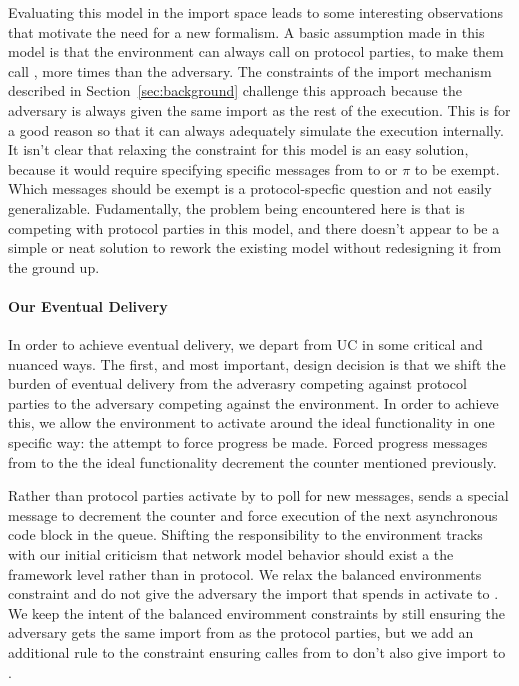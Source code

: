 Evaluating this model in the import space leads to some interesting observations that motivate the need for a new formalism.
A basic assumption made in this model is that the environment can always call on protocol parties, to make them call , more times than the adversary. 
The constraints of the import mechanism described in Section~\ref{sec:background} challenge this approach because the adversary is always given the same import as the rest of the execution.
This is for a good reason so that it can always adequately simulate the execution internally.
It isn't clear that relaxing the constraint for this model is an easy solution, because it would require specifying specific messages from \Z to \A or $\pi$ to be exempt.
Which messages should be exempt is a protocol-specfic question and not easily generalizable.
Fudamentally, the problem being encountered here is that \A is competing with protocol parties in this model, and there doesn't appear to be a simple or neat solution to rework the existing model without redesigning it from the ground up.

\paragraph{Our Eventual Delivery}
In order to achieve eventual delivery, we depart from UC in some critical and nuanced ways.
The first, and most important, design decision is that we shift the burden of eventual delivery from the adverasry competing against protocol parties to the adversary competing against the environment. 
In order to achieve this, we allow the environment to activate \fwrapper around the ideal functionality in one specific way: the attempt to force progress be made.
Forced progress messages from \Z to the the ideal functionality decrement the counter mentioned previously.

Rather than protocol parties activate by \Z to poll for new messages, \Z sends a special  message to decrement the counter and force execution of the next asynchronous code block in the queue.
Shifting the responsibility to the environment tracks with our initial criticism that network model behavior should exist a the framework level rather than in protocol.
We relax the balanced environments constraint and do not give the adversary the import that \Z spends in activate \fwrapper to .
We keep the intent of the balanced enviromment constraints by still ensuring the adversary gets the same import from \Z as the protocol parties, but we add an additional rule to the constraint ensuring  calles from \Z to \F don't also give import to \A.

